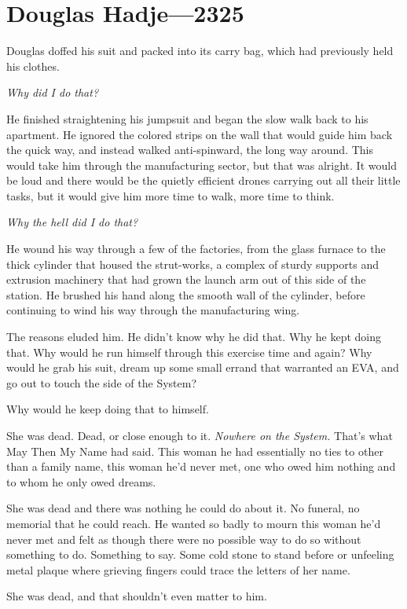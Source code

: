 \hypertarget{douglas-hadje-2325}{%
\chapter{Douglas Hadje---2325}\label{douglas-hadje-2325}}

Douglas doffed his suit and packed into its carry bag, which had previously held his clothes.

\emph{Why did I do that?}

He finished straightening his jumpsuit and began the slow walk back to his apartment. He ignored the colored strips on the wall that would guide him back the quick way, and instead walked anti-spinward, the long way around. This would take him through the manufacturing sector, but that was alright. It would be loud and there would be the quietly efficient drones carrying out all their little tasks, but it would give him more time to walk, more time to think.

\emph{Why the hell did I do that?}

He wound his way through a few of the factories, from the glass furnace to the thick cylinder that housed the strut-works, a complex of sturdy supports and extrusion machinery that had grown the launch arm out of this side of the station. He brushed his hand along the smooth wall of the cylinder, before continuing to wind his way through the manufacturing wing.

The reasons eluded him. He didn't know why he did that. Why he kept doing that. Why would he run himself through this exercise time and again? Why would he grab his suit, dream up some small errand that warranted an EVA, and go out to touch the side of the System?

Why would he keep doing that to himself.

She was dead. Dead, or close enough to it. \emph{Nowhere on the System.} That's what May Then My Name had said. This woman he had essentially no ties to other than a family name, this woman he'd never met, one who owed him nothing and to whom he only owed dreams.

She was dead and there was nothing he could do about it. No funeral, no memorial that he could reach. He wanted so badly to mourn this woman he'd never met and felt as though there were no possible way to do so without something to do. Something to say. Some cold stone to stand before or unfeeling metal plaque where grieving fingers could trace the letters of her name.

She was dead, and that shouldn't even matter to him.

